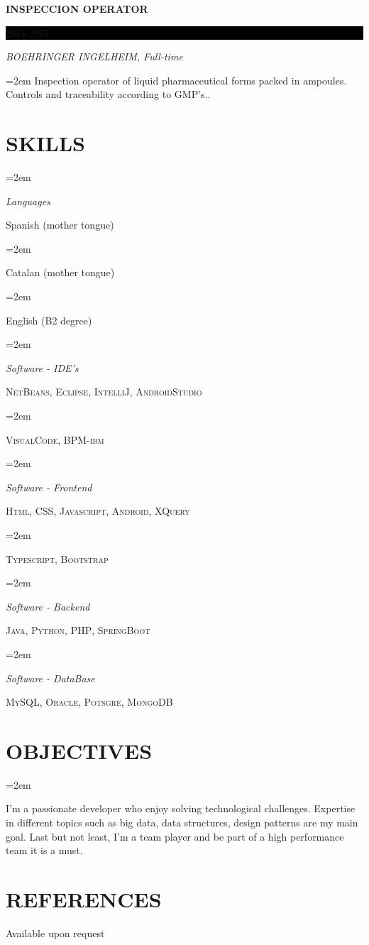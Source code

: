 \documentclass[paper=a4,fontsize=11pt]{scrartcl} %
\newlength{\spacebox}
\newcommand{\sepspace}{\vspace*{1em}}		%
\newcommand{\NewPart}[1]{\section*{\uppercase{#1}}}
\newcommand{\PersonalEntry}[2]{
		\noindent\hangindent=2em\hangafter=0 %
		\parbox{\spacebox}{        %
		\textit{#1}}		       %
		\hspace{1.5em} #2 \par}    %
\newcommand{\ObjectivesEntry}[2]{      %
		\noindent\hangindent=2em\hangafter=0 %
		\parbox{\spacebox}{        %
		\textit{#1}}			   %
		\hspace{1.5em} #2 \par}    %
\newcommand{\SkillsEntry}[2]{      %
		\noindent\hangindent=2em\hangafter=0 %
		\parbox{\spacebox}{        %
		\textit{#1}}			   %
		\hspace{1.5em} #2 \par}    %
\newcommand{\EducationEntry}[4]{
		\noindent \textbf{#1} \hfill      %
		\colorbox{Black}{%
			\parbox{6em}{%
			\hfill\color{White}#2}} \par  %
		\noindent \textit{#3} \par        %
		\noindent\hangindent=2em\hangafter=0 \small #4 %
		\normalsize \par}
\begin{document}
\EducationEntry{INSPECCION OPERATOR}{2014-2015}{BOEHRINGER INGELHEIM, Full-time}{Inspection operator of liquid pharmaceutical forms packed in ampoules. Controls and traceability according to GMP's..}
\sepspace

\NewPart{Skills}{}

\SkillsEntry{Languages}{Spanish (mother tongue)}
\SkillsEntry{}{Catalan (mother tongue)}
\SkillsEntry{}{English (B2 degree)}


\SkillsEntry{Software - IDE's}{\textsc{NetBeans}, \textsc{Eclipse}, \textsc{IntelliJ}, \textsc{AndroidStudio}}
\SkillsEntry{}{\textsc{VisualCode}, \textsc{BPM-ibm}}
\sepspace

\SkillsEntry{Software - Frontend}{\textsc{Html}, \textsc{CSS}, \textsc{Javascript}, \textsc{Android}, \textsc{XQuery}}
\SkillsEntry{}{\textsc{Typescript}, \textsc{Bootstrap}}
\sepspace

\SkillsEntry{Software - Backend}{\textsc{Java}, \textsc{Python}, \textsc{PHP}, \textsc{SpringBoot}}
\sepspace

\SkillsEntry{Software - DataBase}{\textsc{MySQL, Oracle, Potsgre, MongoDB}}
\sepspace

\NewPart{Objectives}{}

\ObjectivesEntry{}{I’m a passionate developer who enjoy solving technological challenges. 
Expertise in different topics such as big data, data structures, design patterns are my main goal. 
Last but not least, I’m a team player and be part of a high performance team it is a must.
}


\NewPart{References}{}
Available upon request
\end{document}
